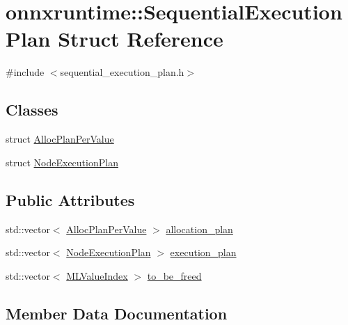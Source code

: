 \hypertarget{structonnxruntime_1_1SequentialExecutionPlan}{}\section{onnxruntime\+:\+:Sequential\+Execution\+Plan Struct Reference}
\label{structonnxruntime_1_1SequentialExecutionPlan}


{\ttfamily \#include $<$sequential\+\_\+execution\+\_\+plan.\+h$>$}

\subsection*{Classes}
\begin{DoxyCompactItemize}
\item 
struct \mbox{\hyperlink{structonnxruntime_1_1SequentialExecutionPlan_1_1AllocPlanPerValue}{Alloc\+Plan\+Per\+Value}}
\item 
struct \mbox{\hyperlink{structonnxruntime_1_1SequentialExecutionPlan_1_1NodeExecutionPlan}{Node\+Execution\+Plan}}
\end{DoxyCompactItemize}
\subsection*{Public Attributes}
\begin{DoxyCompactItemize}
\item 
std\+::vector$<$ \mbox{\hyperlink{structonnxruntime_1_1SequentialExecutionPlan_1_1AllocPlanPerValue}{Alloc\+Plan\+Per\+Value}} $>$ \mbox{\hyperlink{structonnxruntime_1_1SequentialExecutionPlan_aaf3a4fafac3284b733fc28a0c7a5976b}{allocation\+\_\+plan}}
\item 
std\+::vector$<$ \mbox{\hyperlink{structonnxruntime_1_1SequentialExecutionPlan_1_1NodeExecutionPlan}{Node\+Execution\+Plan}} $>$ \mbox{\hyperlink{structonnxruntime_1_1SequentialExecutionPlan_a8dd9976847a1549154b538736b633ce1}{execution\+\_\+plan}}
\item 
std\+::vector$<$ \mbox{\hyperlink{namespaceonnxruntime_ab37a9454e2bb44bd7f75a95158097c8a}{M\+L\+Value\+Index}} $>$ \mbox{\hyperlink{structonnxruntime_1_1SequentialExecutionPlan_abfe34159a6b29c1d2c705b9e77e93875}{to\+\_\+be\+\_\+freed}}
\end{DoxyCompactItemize}


\subsection{Member Data Documentation}
\mbox{\label{structonnxruntime_1_1SequentialExecutionPlan_aaf3a4fafac3284b733fc28a0c7a5976b}} 

